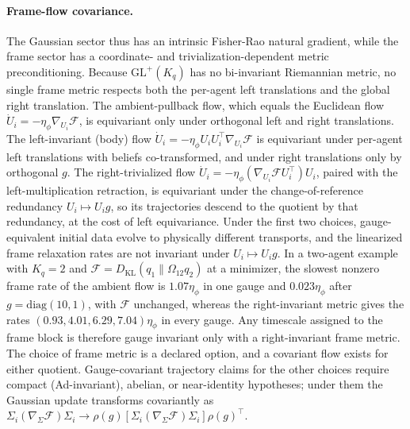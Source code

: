 \paragraph{Frame-flow covariance.}
The Gaussian sector thus has an intrinsic Fisher-Rao natural gradient, while the frame sector has a coordinate- and trivialization-dependent metric preconditioning. Because $\mathrm{GL}^+(K_q)$ has no bi-invariant Riemannian metric, no single frame metric respects both the per-agent left translations and the global right translation. The ambient-pullback flow, which equals the Euclidean flow $\dot U_i = -\eta_\phi\nabla_{U_i}\mathcal{F}$, is equivariant only under orthogonal left and right translations. The left-invariant (body) flow $\dot U_i = -\eta_\phi U_iU_i^\top\nabla_{U_i}\mathcal{F}$ is equivariant under per-agent left translations with beliefs co-transformed, and under right translations only by orthogonal $g$. The right-trivialized flow $\dot U_i = -\eta_\phi(\nabla_{U_i}\mathcal{F}U_i^\top)U_i$, paired with the left-multiplication retraction, is equivariant under the change-of-reference redundancy $U_i\mapsto U_ig$, so its trajectories descend to the quotient by that redundancy, at the cost of left equivariance. Under the first two choices, gauge-equivalent initial data evolve to physically different transports, and the linearized frame relaxation rates are not invariant under $U_i\mapsto U_ig$. In a two-agent example with $K_q = 2$ and $\mathcal{F} = D_{\mathrm{KL}}(q_1\|\Omega_{12}q_2)$ at a minimizer, the slowest nonzero frame rate of the ambient flow is $1.07\eta_\phi$ in one gauge and $0.023\eta_\phi$ after $g = \mathrm{diag}(10, 1)$, with $\mathcal{F}$ unchanged, whereas the right-invariant metric gives the rates $(0.93, 4.01, 6.29, 7.04)\eta_\phi$ in every gauge. Any timescale assigned to the frame block is therefore gauge invariant only with a right-invariant frame metric. The choice of frame metric is a declared option, and a covariant flow exists for either quotient. Gauge-covariant trajectory claims for the other choices require compact (Ad-invariant), abelian, or near-identity hypotheses; under them the Gaussian update transforms covariantly as $\Sigma_i(\nabla_\Sigma\mathcal{F})\Sigma_i \to \rho(g)[\Sigma_i(\nabla_\Sigma\mathcal{F})\Sigma_i]\rho(g)^\top$.

